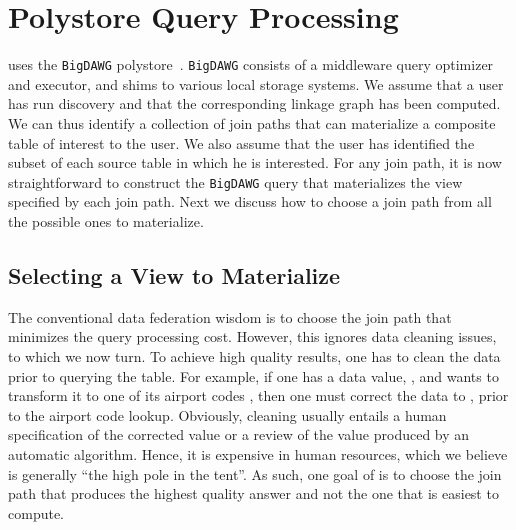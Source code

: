 \section{Polystore Query Processing}
\label{sec:curating}

\dcv uses the \texttt{BigDAWG} polystore~\cite{DBLP:journals/pvldb/ElmoreDSBCGHHKK15}. \texttt{BigDAWG} consists of a middleware query optimizer and executor, and shims to various local storage systems. 
We assume that a user has run discovery and that the corresponding linkage graph has been computed. 
We can thus identify a collection of join paths that can materialize a composite table of interest to the user. 
We also assume that the user has identified the subset of each source table in which he is interested. 
For any join path, it is now straightforward to construct the \texttt{BigDAWG} query that materializes the view specified by each join path. 
Next we discuss how to choose a join path from all the possible ones to materialize.
	



\subsection{Selecting a View to Materialize}

The conventional data federation wisdom is to choose the join path that minimizes the query processing cost. However, this ignores data cleaning issues, to which we now turn. To achieve high quality results, one has to clean the data prior to querying the table. For example, if one has a data value, , and wants to transform it to one of its airport codes , then one must correct the data to , prior to the airport code lookup. Obviously, cleaning usually entails a human specification of the corrected value or a review of the value produced by an automatic algorithm. Hence, it is expensive in human resources, which we believe is generally ``the high pole in the tent''. 
As such, one goal of \dcv is to choose the join path that produces the highest quality answer and not the one that is easiest to compute. 

